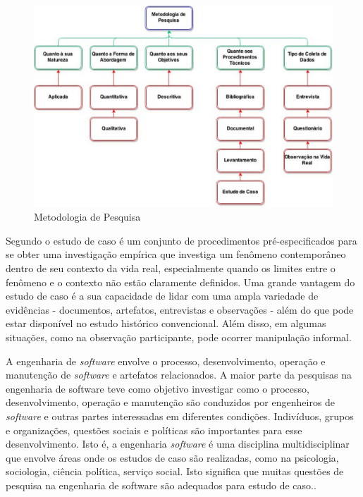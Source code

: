 \begin{figure}[h!]
\centering
\includegraphics[keepaspectratio=false,scale=0.5]{figuras/figuras_nilton/selecaoMetodologica.eps}
\caption{Metodologia de Pesquisa}
\label{7eixosqualidade}
\end{figure}

Segundo \cite{yin2001estudo} o estudo de caso é um conjunto de procedimentos pré-especificados para se obter uma investigação empírica que investiga um fenômeno contemporâneo dentro de seu contexto da vida real, especialmente quando os limites entre o fenômeno e o contexto não estão claramente definidos. Uma grande vantagem do estudo de caso é a sua capacidade de lidar com uma ampla variedade de evidências - documentos, artefatos, entrevistas e observações - além do que pode estar disponível no estudo histórico convencional. Além disso, em algumas situações, como na observação participante, pode ocorrer manipulação informal.

A engenharia de \textit{software} envolve o processo, desenvolvimento, operação e manutenção  de \textit{software} e artefatos relacionados. A maior parte da pesquisas na engenharia de software teve como objetivo investigar como o processo, desenvolvimento, operação e manutenção são conduzidos por engenheiros de \textit{software} e outras partes interessadas em diferentes condições. Indivíduos, grupos e organizações, questões sociais e políticas são importantes para esse desenvolvimento. Isto é, a engenharia \textit{software } é uma disciplina multidisciplinar que envolve áreas onde os estudos de caso são realizadas, como na psicologia, sociologia, ciência política, serviço social. Isto significa que muitas questões de pesquisa na engenharia de software são adequados para estudo de caso.\cite{wohlin2012experimentation}.

